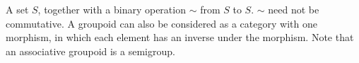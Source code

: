 A set $S$, together with a binary operation $\sim$ from $S$ to $S$. 
$\sim$ need not be commutative.
A groupoid can also be considered as a category with one
morphism, in which each element has an inverse under the 
morphism.
Note that an associative groupoid is a semigroup.
